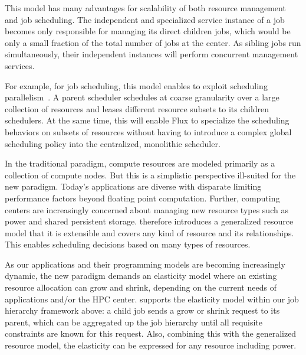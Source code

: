 This model has many advantages for scalability of both
resource management and job scheduling. 
The independent and specialized \flux service instance
of a job becomes only responsible for managing its direct
children jobs, which would be only a small fraction of
the total number of jobs at the center. 
As sibling jobs run simultaneously, their independent
\flux instances will perform concurrent management services.

For example, for job scheduling, this model enables \flux
to exploit scheduling parallelism~\cite{Omega,Mesos}.
A parent scheduler schedules at coarse granularity 
over a large collection of resources and leases different resource subsets 
to its children schedulers. 
At the same time, this will enable Flux to specialize the scheduling behaviors 
on subsets of resources without having to introduce a
complex global scheduling policy into the centralized, monolithic scheduler. 


 In the traditional 
paradigm, compute resources are modeled primarily 
as a collection of compute nodes. But this is a simplistic perspective 
ill-suited for the new paradigm. Today's applications 
are diverse with disparate limiting performance factors 
beyond floating point computation. 
Further, computing centers are increasingly concerned 
about managing new resource types such as power 
and shared persistent storage. \flux therefore introduces a generalized resource
model that it is extensible and covers any kind of resource and its relationships. This enables scheduling
decisions based on many types of resources.


 As our 
applications and their programming models are becoming 
increasingly dynamic, the new paradigm demands 
an elasticity model where an existing resource allocation 
can grow and shrink, depending on the current needs 
of applications and/or the HPC center. 
\flux supports the elasticity model within our job hierarchy 
framework above: a child job sends a grow or shrink request 
to its parent, which can be aggregated up the job hierarchy 
until all requisite constraints are known for this request. 
Also, combining this with the generalized resource model, 
the elasticity can be expressed for any resource including 
power. 

